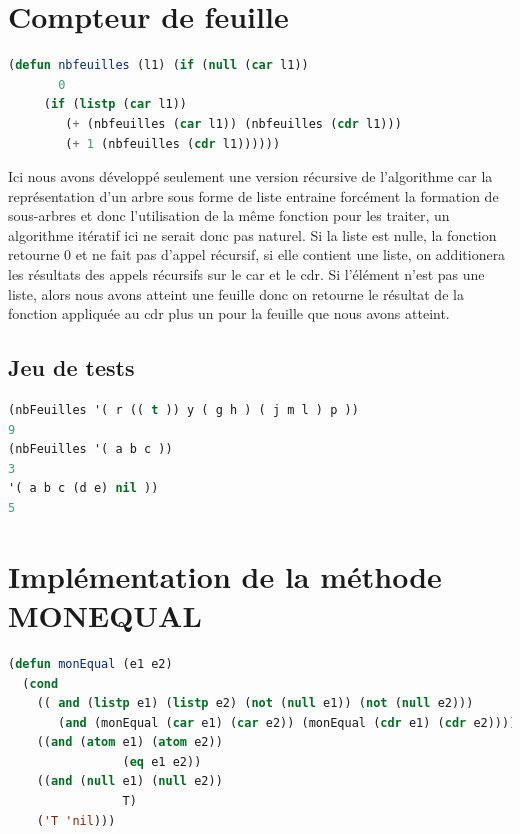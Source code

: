 \documentclass[a4paper,10pt]{report}
\begin{document}
	\section{Compteur de feuille}
	
	   \begin{lstlisting}[language=Lisp]
(defun nbfeuilles (l1) (if (null (car l1))
	   0
	 (if (listp (car l1)) 
	    (+ (nbfeuilles (car l1)) (nbfeuilles (cdr l1))) 
	    (+ 1 (nbfeuilles (cdr l1))))))
	  \end{lstlisting}

	Ici nous avons développé seulement une version récursive de l'algorithme car la représentation d'un arbre sous forme de liste entraine forcément la formation de sous-arbres et donc l'utilisation
	de la même fonction pour les traiter, un algorithme itératif ici ne serait donc pas naturel. Si la liste est nulle, la fonction retourne 0 et ne fait pas d'appel récursif,
	si elle contient une liste, on additionera les résultats des appels récursifs sur le car et le cdr. Si l'élément n'est pas une liste, alors nous avons atteint une feuille
	donc on retourne le résultat de la fonction appliquée au cdr plus un pour la feuille que nous avons atteint.
	
	  \subsection{Jeu de tests}
	\begin{lstlisting}[language=Lisp]
(nbFeuilles '( r (( t )) y ( g h ) ( j m l ) p ))
9
(nbFeuilles '( a b c ))
3
'( a b c (d e) nil ))
5
	\end{lstlisting}\newpage
	\section{Implémentation de la méthode MONEQUAL}
	  \begin{lstlisting}[language=Lisp]
(defun monEqual (e1 e2)
  (cond 
    (( and (listp e1) (listp e2) (not (null e1)) (not (null e2)))
       (and (monEqual (car e1) (car e2)) (monEqual (cdr e1) (cdr e2))))
    ((and (atom e1) (atom e2))
                (eq e1 e2))
    ((and (null e1) (null e2))
                T)
    ('T 'nil)))
	  \end{lstlisting}
\end{document}
